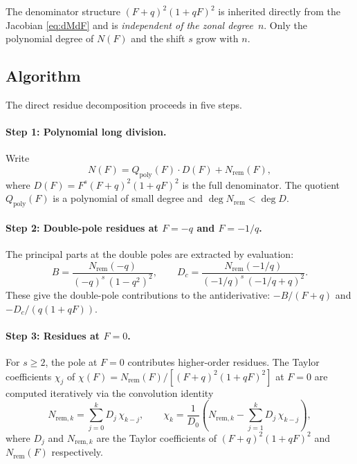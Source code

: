 \documentclass[11pt]{article}
\begin{document}
The denominator structure $(F+q)^2(1+qF)^2$ is inherited directly from the
Jacobian \eqref{eq:dMdF} and is \emph{independent of the zonal degree}~$n$.
Only the polynomial degree of $N(F)$ and the shift $s$ grow with $n$.

\subsection{Algorithm}

The direct residue decomposition proceeds in five steps.

\paragraph{Step 1: Polynomial long division.}
Write
\begin{equation}
N(F) = Q_{\mathrm{poly}}(F) \cdot D(F) + N_{\mathrm{rem}}(F),
\end{equation}
where $D(F) = F^s (F+q)^2 (1+qF)^2$ is the full denominator. The quotient
$Q_{\mathrm{poly}}(F)$ is a polynomial of small degree and
$\deg N_{\mathrm{rem}} < \deg D$.

\paragraph{Step 2: Double-pole residues at $F = -q$ and $F = -1/q$.}
The principal parts at the double poles are extracted by evaluation:
\begin{equation}
B = \frac{N_{\mathrm{rem}}(-q)}{(-q)^s\,(1-q^2)^2},
\qquad
D_c = \frac{N_{\mathrm{rem}}(-1/q)}{(-1/q)^s\,\left(-1/q + q\right)^2}.
\label{eq:double_pole_residues}
\end{equation}
These give the double-pole contributions to the antiderivative:
$-B/(F+q)$ and $-D_c/(q(1+qF))$.

\paragraph{Step 3: Residues at $F = 0$.}
For $s \ge 2$, the pole at $F = 0$ contributes higher-order residues.
The Taylor coefficients $\chi_j$ of
$\chi(F) = N_{\mathrm{rem}}(F) / [(F+q)^2(1+qF)^2]$
at $F = 0$ are computed iteratively via the convolution identity
\begin{equation}
N_{\mathrm{rem},k}
= \sum_{j=0}^{k} D_j \,\chi_{k-j},
\qquad
\chi_k = \frac{1}{D_0}\left(N_{\mathrm{rem},k}
- \sum_{j=1}^{k} D_j\, \chi_{k-j}\right),
\label{eq:taylor_recurrence}
\end{equation}
where $D_j$ and $N_{\mathrm{rem},k}$ are the Taylor coefficients of
$(F+q)^2(1+qF)^2$ and $N_{\mathrm{rem}}(F)$ respectively.
\end{document}
